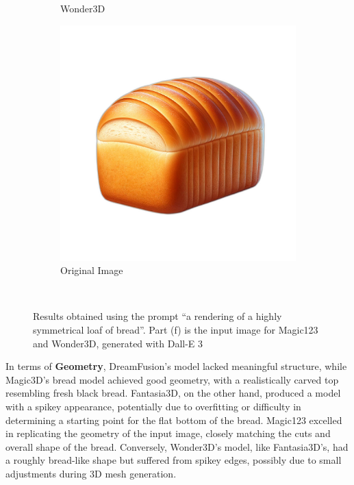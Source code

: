 \begin{figure}[ht]
\begin{subfigure}[b]{0.23\textwidth}
        \caption{Wonder3D}
        \vspace{0.1cm}
    \end{subfigure}
    \begin{subfigure}[b]{0.23\textwidth}
        \centering
        \includegraphics[width=\textwidth]{etc/Images/bread.png}
        \caption{Original Image}
        \vspace{0.1cm}
    \end{subfigure}
    \caption{Results obtained using the prompt ``a rendering of a highly symmetrical loaf of bread''. Part (f) is the input image for Magic123 and Wonder3D, generated with Dall-E 3}~\label{fig:resultBread}
\end{figure}

In terms of \textbf{Geometry}, DreamFusion's model lacked meaningful structure, while Magic3D's bread model achieved good geometry, with a realistically carved top resembling fresh black bread. Fantasia3D, on the other hand, produced a model with a spikey appearance, potentially due to overfitting or difficulty in determining a starting point for the flat bottom of the bread. Magic123 excelled in replicating the geometry of the input image, closely matching the cuts and overall shape of the bread. Conversely, Wonder3D's model, like Fantasia3D's, had a roughly bread-like shape but suffered from spikey edges, possibly due to small adjustments during 3D mesh generation.

